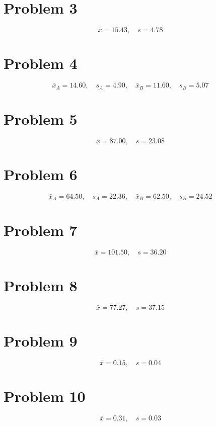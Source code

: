 \section{Problem 3}
\[
\bar{x}=15.43,\quad s=4.78
\]

\section{Problem 4}
\[
\bar{x}_A=14.60,\quad s_A=4.90,\quad \bar{x}_B=11.60,\quad s_B=5.07
\]

\section{Problem 5}
\[
\bar{x}=87.00,\quad s=23.08
\]

\section{Problem 6}
\[
\bar{x}_A=64.50,\quad s_A=22.36,\quad \bar{x}_B=62.50,\quad s_B=24.52
\]

\section{Problem 7}
\[
\bar{x}=101.50,\quad s=36.20
\]

\section{Problem 8}
\[
\bar{x}=77.27,\quad s=37.15
\]

\section{Problem 9}
\[
\bar{x}=0.15,\quad s=0.04
\]

\section{Problem 10}
\[
\bar{x}=0.31,\quad s=0.03
\]


